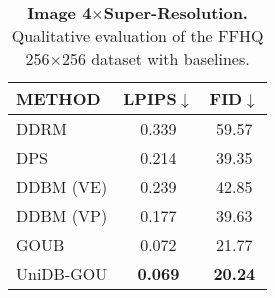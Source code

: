 \begin{table*}[h]
    \centering
    \caption{\textbf{Image 4$\times$Super-Resolution.} Qualitative evaluation of the CelebA-HQ 256$\times$256 datasets with baselines.}
    \vskip 0.1in
    \footnotesize

    \tabcolsep=0.3cm
    \label{sr_table_Celeba}
\end{table*}


\begin{table}[H]
    
  \centering
  \caption{\textbf{Image 4$\times$Super-Resolution.} Qualitative evaluation of the FFHQ 256$\times$256 dataset with baselines.}
  \label{sr_table_ffhq}
  \vskip 0.05in
  \begin{tabular}{lcc}
    \toprule
    \textbf{METHOD} & \textbf{LPIPS$\downarrow$} & \textbf{FID$\downarrow$}  \\
    \midrule
    DDRM & 0.339 & 59.57 \\  
    DPS & 0.214 & 39.35 \\
    DDBM (VE) & 0.239 & 42.85 \\
    DDBM (VP) & 0.177 & 39.63 \\
    GOUB & 0.072 & 21.77 \\
    \midrule
    UniDB-GOU & \textbf{0.069} & \textbf{20.24} \\ 
    \bottomrule			
  \end{tabular}
\vskip -0.1in
\end{table}


